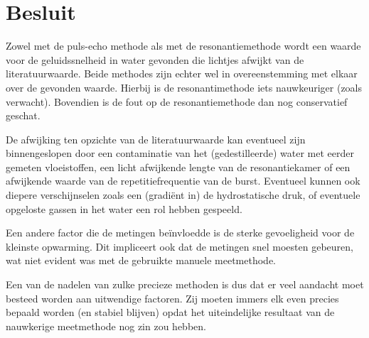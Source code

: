 \section{Besluit}
Zowel met de puls-echo methode als met de resonantiemethode wordt een 
waarde voor de geluidssnelheid in water gevonden die lichtjes afwijkt van 
de literatuurwaarde.  Beide methodes zijn echter wel in overeenstemming met 
elkaar over de gevonden waarde.  Hierbij is de resonantimethode iets 
nauwkeuriger (zoals verwacht).  Bovendien is de fout op de 
resonantiemethode dan nog conservatief geschat.

De afwijking ten opzichte van de literatuurwaarde kan eventueel zijn 
binnengeslopen door een contaminatie van het (gedestilleerde) water met 
eerder gemeten vloeistoffen, een licht afwijkende lengte van de 
resonantiekamer of een afwijkende waarde van de repetitiefrequentie van de 
burst. Eventueel kunnen ook diepere verschijnselen zoals een (gradi\"ent 
in) de hydrostatische druk, of eventuele opgeloste gassen in het water een 
rol hebben gespeeld.

Een andere factor die de metingen be\"invloedde is de sterke gevoeligheid 
voor de kleinste opwarming. Dit impliceert ook dat de metingen snel moesten 
gebeuren, wat niet evident was met de gebruikte manuele meetmethode.

Een van de nadelen van zulke precieze methoden is dus dat er veel aandacht 
moet besteed worden aan uitwendige factoren. Zij moeten immers elk even 
precies bepaald worden (en stabiel blijven) opdat het uiteindelijke 
resultaat van de nauwkerige meetmethode nog zin zou hebben.
